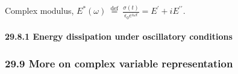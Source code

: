 Complex modulus,
\(E^{*}(\omega) \stackrel{\text { def }}{=} \frac{\sigma(t)}{\epsilon_{0} e^{i \omega t}}=E^{\prime}+i E^{\prime \prime}\).

\hypertarget{energy-dissipation-under-oscillatory-conditions}{%
\paragraph{29.8.1 Energy dissipation under oscillatory
conditions}\label{energy-dissipation-under-oscillatory-conditions}}

\hypertarget{more-on-complex-variable-representation}{%
\subsubsection{29.9 More on complex variable
representation}\label{more-on-complex-variable-representation}}

